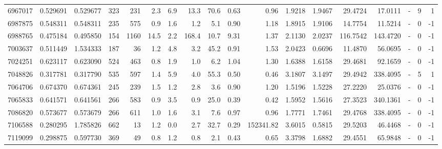 \begin{tabular}{rrrrrrrrrrrrrrrlrr}
   6967017 & 0.529691 &   0.529677 &  323 &  231 &      2.3 &      6.9 &    13.3 &     70.6 &       0.63 &        0.96 &  1.9218 &  1.9467 &   29.4724 &   17.0111 &             - &        9 &          1 \\
   6987875 & 0.548311 &   0.548311 &  235 &  575 &      0.9 &      1.6 &     1.2 &      5.1 &       0.90 &        1.18 &  1.8915 &  1.9106 &   14.7754 &   11.5214 &             - &        0 &         -1 \\
   6988765 & 0.475184 &   0.495850 &  154 & 1160 &     14.5 &      2.2 &   168.4 &     10.7 &       9.31 &        1.37 &  2.1130 &  2.0237 &  116.7542 &  143.4720 &             - &        0 &         -1 \\
   7003637 & 0.511449 &   1.534333 &  187 &   36 &      1.2 &      4.8 &     3.2 &     45.2 &       0.91 &        1.53 &  2.0423 &  0.6696 &   11.4870 &   56.0695 &             - &        0 &         -1 \\
   7024251 & 0.623117 &   0.623090 &  524 &  463 &      0.8 &      1.9 &     1.0 &      6.2 &       1.04 &        1.30 &  1.6388 &  1.6158 &   29.4681 &   92.1659 &             - &        0 &         -1 \\
   7048826 & 0.317781 &   0.317790 &  535 &  597 &      1.4 &      5.9 &     4.0 &     55.3 &       0.50 &        0.46 &  3.1807 &  3.1497 &   29.4942 &  338.4095 &             - &        5 &          1 \\
   7064706 & 0.674370 &   0.674361 &  245 &  239 &      1.5 &      1.2 &     2.8 &      3.6 &       0.90 &        1.20 &  1.5196 &  1.5228 &   27.2220 &   25.0376 &             - &        0 &         -1 \\
   7065833 & 0.641571 &   0.641561 &  266 &  583 &      0.9 &      3.5 &     0.9 &     25.0 &       0.39 &        0.42 &  1.5952 &  1.5616 &   27.3523 &  340.1361 &             - &        0 &         -1 \\
   7086820 & 0.573677 &   0.573679 &  266 &  611 &      1.0 &      1.6 &     3.1 &      7.6 &       0.97 &        0.96 &  1.7771 &  1.7461 &   29.4768 &  338.4095 &             - &        0 &         -1 \\
   7106588 & 0.280295 &   1.785826 &  662 &   13 &      1.2 &      0.0 &     2.7 &     32.7 &       0.29 &   152341.82 &  3.6015 &  0.5815 &   29.5203 &   46.4468 &             - &        0 &         -1 \\
   7119099 & 0.298875 &   0.597730 &  369 &   49 &      0.8 &      1.2 &     0.8 &      2.1 &       0.43 &        0.65 &  3.3798 &  1.6882 &   29.4551 &   65.9848 &             - &        0 &         -1 \\

\end{tabular}

